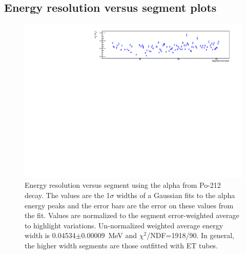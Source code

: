 \subsection{Energy resolution versus segment plots}
\begin{figure}[!h]
\centering
\includegraphics[width=1.05\textwidth]{figures/PubBiPo212EresvsCell.pdf}
\caption{\label{fig:EresvsCell212}Energy resolution versus segment using the alpha from Po-212 decay. The values are the 1$\sigma$ widths of a Gaussian fits to the alpha energy peaks and the error bars are the error on these values from the fit. Values are normalized to the segment error-weighted average to highlight variations. Un-normalized weighted average energy width is 0.04534$\pm$0.00009~MeV and $\chi^2$/NDF=1918/90.  In general, the higher width segments are those outfitted with ET tubes.}
\end{figure}
